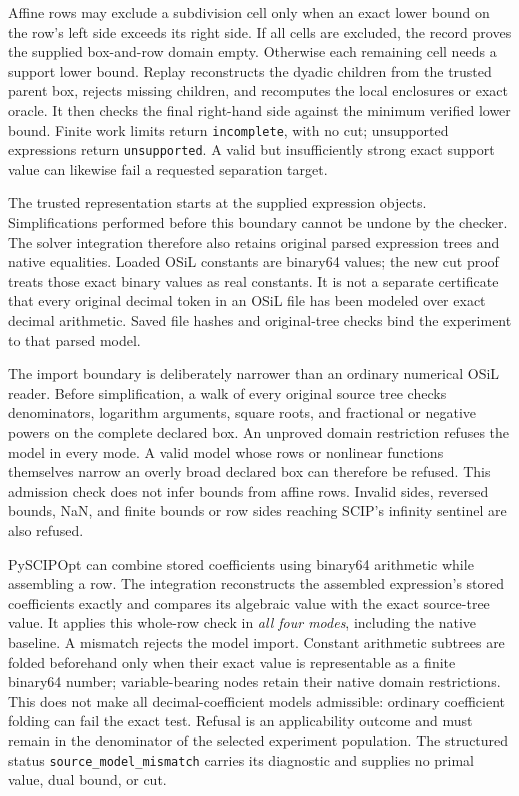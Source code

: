 Affine rows may exclude a subdivision cell only when an exact lower
bound on the row's left side exceeds its right side. If all cells are
excluded, the record proves the supplied box-and-row domain empty.
Otherwise each remaining cell needs a support lower bound. Replay
reconstructs the dyadic children from the trusted parent box, rejects
missing children, and recomputes the local enclosures or exact oracle.
It then checks the final right-hand side against the minimum verified
lower bound. Finite work limits return \texttt{incomplete}, with no
cut; unsupported expressions return \texttt{unsupported}. A valid but
insufficiently strong exact support value can likewise fail a requested
separation target.

The trusted representation starts at the supplied expression objects.
Simplifications performed before this boundary cannot be undone by
the checker. The solver integration therefore also retains original
parsed expression trees and native equalities. Loaded OSiL constants
are binary64 values; the new cut proof treats those exact binary values
as real constants. It is not a separate certificate that every original
decimal token in an OSiL file has been modeled over exact decimal
arithmetic. Saved file hashes and original-tree checks bind the
experiment to that parsed model.

The import boundary is deliberately narrower than an ordinary numerical
OSiL reader. Before simplification, a walk of every original source tree
checks denominators, logarithm arguments, square roots, and fractional
or negative powers on the complete declared box. An unproved domain
restriction refuses the model in every mode. A valid model whose rows
or nonlinear functions themselves narrow an overly broad declared box
can therefore be refused. This admission check does not infer bounds
from affine rows. Invalid sides, reversed bounds, NaN, and finite bounds
or row sides reaching SCIP's infinity sentinel are also refused.

PySCIPOpt can combine stored coefficients using binary64
arithmetic while assembling a row. The integration reconstructs the
assembled expression's stored coefficients exactly and compares its
algebraic value with the exact source-tree value. It applies this
whole-row check in \emph{all four modes}, including the native baseline.
A mismatch rejects the model import. Constant arithmetic subtrees are
folded beforehand only when their exact value is representable as a
finite binary64 number; variable-bearing nodes retain their native
domain restrictions. This does not make all decimal-coefficient models
admissible: ordinary coefficient folding can fail the exact test.
Refusal is an applicability outcome and must remain in the denominator
of the selected experiment population.
The structured status \texttt{source\_model\_mismatch} carries its
diagnostic and supplies no primal value, dual bound, or cut.

